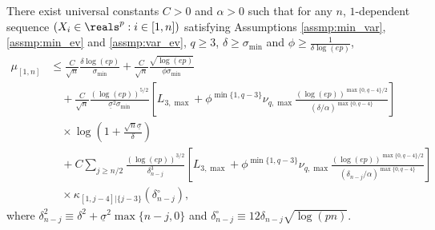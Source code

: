 \documentclass[aos]{imsart}
\begin{document}
\begin{lemma} \label{thm:induction_lemma_BE_3N}
    There exist universal constants $C > 0$ and $\alpha > 0$ such that for any $n$, $1$-dependent sequence $(X_i \in \reals^p: i \in [1,n])$ satisfying Assumptions \eqref{assmp:min_var}, \eqref{assmp:min_ev} and \eqref{assmp:var_ev}, $q \geq 3$, $\delta \geq \sigma_{\min}$ and $\phi \geq \frac{1}{\delta \log(ep)}$,
    \begin{equation*}
    \begin{aligned}
        \mu_{[1,n]}
        & \leq \frac{C}{\sqrt{n}} \frac{\delta \log(ep)}{\sigma_{\min}}  
        + \frac{C}{\sqrt{n}} \frac{\sqrt{\log(ep)}}{\phi \sigma_{\min}} \\
        & \quad + \frac{C}{\sqrt{n}} \frac{(\log(ep))^{5/2}}{\underline{\sigma}^2\sigma_{\min}}
        \left[ 
            {L}_{3,\max} + \phi^{\min\{1, q-3\}} \nu_{q,\max} \frac{ {(\log(ep))}^{\max\{0, q-4\}/2}}{(\delta/\alpha)^{\max\{0, q-4\}}}
        \right] \\
        & \quad \times \log\left(1 + \frac{\sqrt{n}\underline{\sigma}}{\delta}\right) \\
        & \quad + C \sum_{j \geq n/2} \frac{(\log(ep))^{3/2}}{\delta_{n-j}^3} \left[ 
            {L}_{3,\max} + \phi^{\min\{1, q-3\}} \nu_{q,\max} \frac{ {(\log(ep))}^{\max\{0, q-4\}/2}}{(\delta_{n-j}/\alpha)^{\max\{0, q-4\}}}
        \right] \\
        & \quad \times \kappa_{[1,j-4]|\{j-3\}}(\delta_{n-j}^\circ),
    \end{aligned}
    \end{equation*}
    where $\delta_{n-j}^2 \equiv \delta^2 + \underline{\sigma}^2 \max\{n-j,0\}$ and $\delta^\circ_{n-j} \equiv 12 \delta_{n-j} \sqrt{\log(pn)}$.
\end{lemma}






\medskip
\end{document}
